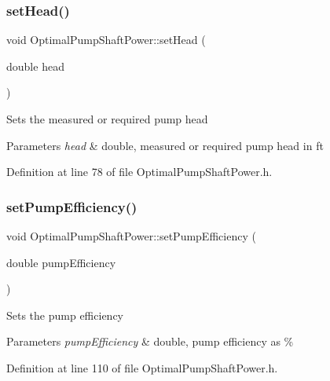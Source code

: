 \subsubsection{\texorpdfstring{set\+Head()}{setHead()}}
{\footnotesize\ttfamily void Optimal\+Pump\+Shaft\+Power\+::set\+Head (\begin{DoxyParamCaption}\item[{double}]{head }\end{DoxyParamCaption})\hspace{0.3cm}{\ttfamily [inline]}}

Sets the measured or required pump head 
\begin{DoxyParams}{Parameters}
{\em head} & double, measured or required pump head in ft \\
\hline
\end{DoxyParams}


Definition at line 78 of file Optimal\+Pump\+Shaft\+Power.\+h.

\mbox{\label{class_optimal_pump_shaft_power_a2cb2c6b537c7db0bc5071f09c66308d0}} 
\subsubsection{\texorpdfstring{set\+Pump\+Efficiency()}{setPumpEfficiency()}}
{\footnotesize\ttfamily void Optimal\+Pump\+Shaft\+Power\+::set\+Pump\+Efficiency (\begin{DoxyParamCaption}\item[{double}]{pump\+Efficiency }\end{DoxyParamCaption})\hspace{0.3cm}{\ttfamily [inline]}}

Sets the pump efficiency 
\begin{DoxyParams}{Parameters}
{\em pump\+Efficiency} & double, pump efficiency as \% \\
\hline
\end{DoxyParams}


Definition at line 110 of file Optimal\+Pump\+Shaft\+Power.\+h.

\mbox{\label{class_optimal_pump_shaft_power_aa565a332e4b144c8eb85fd06c541199e}} 
